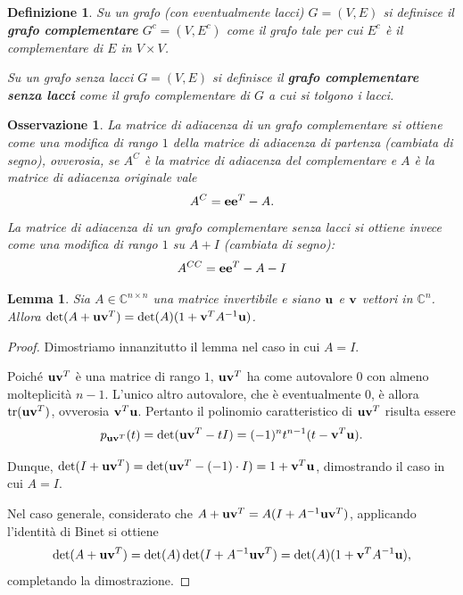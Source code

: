 \documentclass[a4paper]{article}
\newcommand{\CC}{\mathbb{C}}
\newcommand{\evec}{{\bf e}}
\newcommand{\vvec}{{\bf v}}
\newcommand{\uvec}{{\bf u}}
\DeclareMathOperator{\tr}{tr}
\newtheorem{lemma}{Lemma}
\newtheorem{definition}{Definizione}
\newtheorem{remark}{Osservazione}
\begin{document}
\begin{definition}
    Su un grafo (con eventualmente lacci) $G = (V, E)$ si definisce il {\rm \textbf{grafo complementare}}
    $G^c = (V, E^c)$ come il grafo tale per cui $E^c$ è il complementare di $E$ in $V \times V$.


    Su un grafo senza lacci $G = (V, E)$ si definisce il {\rm \textbf{grafo complementare senza lacci}} come il grafo complementare di $G$ a cui
    si tolgono i lacci.
\end{definition}

\begin{remark}
    La matrice di adiacenza di un grafo complementare si ottiene come
    una modifica di rango $1$ della matrice di adiacenza di partenza (cambiata di segno), ovverosia, se $A^C$ è la matrice di adiacenza
    del complementare e $A$ è la matrice di adiacenza originale vale
    \[
        A^C = \evec \evec^T - A.
    \]
    La matrice di adiacenza di un grafo complementare senza lacci si
    ottiene invece come una modifica di rango $1$ su $A+I$ (cambiata
    di segno):
    \[
        A^{CC} = \evec \evec^T - A - I
    \]
\end{remark}

\begin{lemma}
    \label{lemma:matrix_determinant_lemma}
    Sia $A \in \CC^{n \times n}$ una matrice invertibile e siano $\uvec$ e $\vvec$ vettori in
    $\CC^n$. Allora $\det(A + \uvec \vvec^T) = \det(A) (1+\vvec^TA^{-1}\uvec)$.
\end{lemma}

\begin{proof}
    Dimostriamo innanzitutto il lemma nel caso in cui $A = I$.
    
    Poiché
    $\uvec \vvec^T$ è una matrice di rango $1$, $\uvec \vvec^T$ ha come autovalore $0$ con
    almeno molteplicità $n-1$. L'unico altro autovalore, che è eventualmente $0$,
    è allora $\tr(\uvec \vvec^T)$, ovverosia $\vvec^T \uvec$. Pertanto il polinomio caratteristico
    di $\uvec \vvec^T$ risulta essere
    \[p_{\uvec \vvec^T}(t) = \det(\uvec \vvec^T - tI) = (-1)^{n} t^{n-1}(t-\vvec^T \uvec).\]

    Dunque, $\det(I+\uvec \vvec^T) = \det(\uvec \vvec^T - (-1)\cdot I) = 1+\vvec^T \uvec$,
    dimostrando il caso in cui $A = I$. 
    
    Nel caso generale, considerato che $A + \uvec \vvec^T = A(I+A^{-1}\uvec \vvec^T)$, applicando l'identità di Binet si ottiene
    \[
        \det(A + \uvec \vvec^T) =
        \det(A) \det(I + A^{-1} \uvec \vvec^T) = \det(A) (1+\vvec^T A^{-1} \uvec),
    \]
    completando la dimostrazione.
\end{proof}
\end{document}
